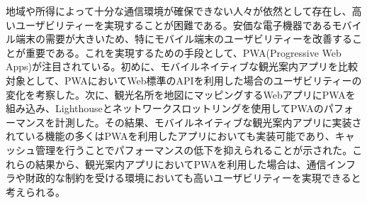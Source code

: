 地域や所得によって十分な通信環境が確保できない人々が依然として存在し、高いユーザビリティーを実現することが困難である。安価な電子機器であるモバイル端末の需要が大きいため、特にモバイル端末のユーザビリティーを改善することが重要である。これを実現するための手段として、PWA(Progressive Web Apps)が注目されている。初めに、モバイルネイティブな観光案内アプリを比較対象として、PWAにおいてWeb標準のAPIを利用した場合のユーザビリティーの変化を考察した。次に、観光名所を地図にマッピングするWebアプリにPWAを組み込み、Lighthouseとネットワークスロットリングを使用してPWAのパフォーマンスを計測した。その結果、モバイルネイティブな観光案内アプリに実装されている機能の多くはPWAを利用したアプリにおいても実装可能であり、キャッシュ管理を行うことでパフォーマンスの低下を抑えられることが示された。これらの結果から、観光案内アプリにおいてPWAを利用した場合は、通信インフラや財政的な制約を受ける環境においても高いユーザビリティーを実現できると考えられる。